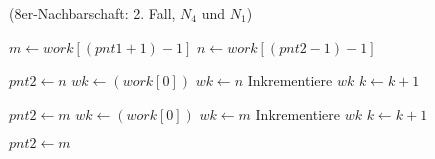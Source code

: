 \begin{algorithm}[!ht]
\caption{ (8er-Nachbarschaft: 2. Fall, $N_4$ und $N_1$)}
\label{alg:arlabeling-neighbour-case2-2}
\begin{algorithmic}[1]
	\State $m \gets \mathit{work}\left[\left(\mathit{pnt1} + 1\right) - 1\right]$
	\State $n \gets \mathit{work}\left[\left(\mathit{pnt2} - 1\right) - 1\right]$

		\State $\mathit{pnt2} \gets n$
		\State $\mathit{wk} \gets \left(\mathit{work}\left[0\right]\right)$
				\State $\mathit{wk} \gets n$
			\EndIf
			\State Inkrementiere $\mathit{wk}$
			\State $k \gets k + 1$
		\EndFor

		\State $\mathit{pnt2} \gets m$
		\State $\mathit{wk} \gets \left(\mathit{work}\left[0\right]\right)$
				\State $\mathit{wk} \gets m$
			\EndIf
			\State Inkrementiere $\mathit{wk}$
			\State $k \gets k + 1$
		\EndFor

	\Else
		\State $\mathit{pnt2} \gets m$
	\EndIf
\end{algorithmic}
\end{algorithm}

